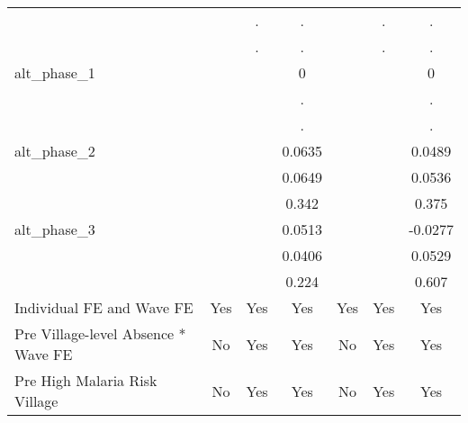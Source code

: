 {\begin{tabular}{l*{6}{c}}
            &                     &           .         &           .         &                     &           .         &           .         \\
            &                     &           .         &           .         &                     &           .         &           .         \\
alt\_phase\_1 &                     &                     &           0         &                     &                     &           0         \\
            &                     &                     &           .         &                     &                     &           .         \\
            &                     &                     &           .         &                     &                     &           .         \\
alt\_phase\_2 &                     &                     &      0.0635         &                     &                     &      0.0489         \\
            &                     &                     &      0.0649         &                     &                     &      0.0536         \\
            &                     &                     &       0.342         &                     &                     &       0.375         \\
alt\_phase\_3 &                     &                     &      0.0513         &                     &                     &     -0.0277         \\
            &                     &                     &      0.0406         &                     &                     &      0.0529         \\
            &                     &                     &       0.224         &                     &                     &       0.607         \\
Individual FE and Wave FE &         Yes         &         Yes         &         Yes         &         Yes         &         Yes         &         Yes         \\
Pre Village-level Absence * Wave FE&          No         &         Yes         &         Yes         &          No         &         Yes         &         Yes         \\
Pre High Malaria Risk Village &          No         &         Yes         &         Yes         &          No         &         Yes         &         Yes         \\

\end{tabular}}
